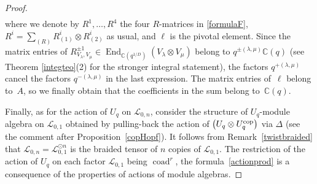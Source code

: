\documentclass[pdftex]{sigma}%
\numberwithin{equation}{section}
\numberwithin{figure}{section}
\newcommand{\mc}{\mathbb{C}}
\newcommand{\Ll}{{\mathcal L}}
\begin{document}
\begin{proof}
\begin{gather*}
\end{gather*}
where we denote by $R^1,\dots,R^4$ the four $R$-matrices in \eqref{formulaF}, $R^i = \sum_{(R)} R_{(1)}^i \otimes R_{(2)}^i$ as usual, and $\ell$ is the pivotal element.
Since the matrix entries of $R_{V_\lambda,V_\mu}^{\pm 1} \in \operatorname{End}_{\mathbb{C}(q^{1/D})}(V_\lambda \otimes V_\mu)$ belong to $q^{\pm (\lambda,\mu)}\mc(q)$ (see Theorem \ref{integteo}(2) for the stronger integral statement), the factors $q^{+(\lambda,\mu)}$ cancel the factors $q^{-(\lambda,\mu)}$ in the last expression. The matrix entries of~$\ell$ belong to~$A$, so we finally obtain that the coefficients in the sum belong to~$\mc(q)$.

Finally, as for the action of $U_q$ on $\Ll_{0,n}$, consider the structure of $U_q$-module algebra on $\Ll_{0,1}$ obtained by pulling-back the action of $\big(U_q\otimes U_q^{\rm cop}\big)$ via $\Delta$ (see the comment after Proposition~\ref{copHopf}). It follows from Remark~\ref{twistbraided} that $\Ll_{0,n}=\Ll_{0,1}^{\odot n}$ is the braided tensor of $n$ copies of $\Ll_{0,1}$. The restriction of the action of $U_q$ on each factor $\Ll_{0,1}$ being $\operatorname{coad}^r$, the formula~\eqref{actionprod} is a consequence of the properties of actions of module algebras.
\end{proof}
\end{document}
